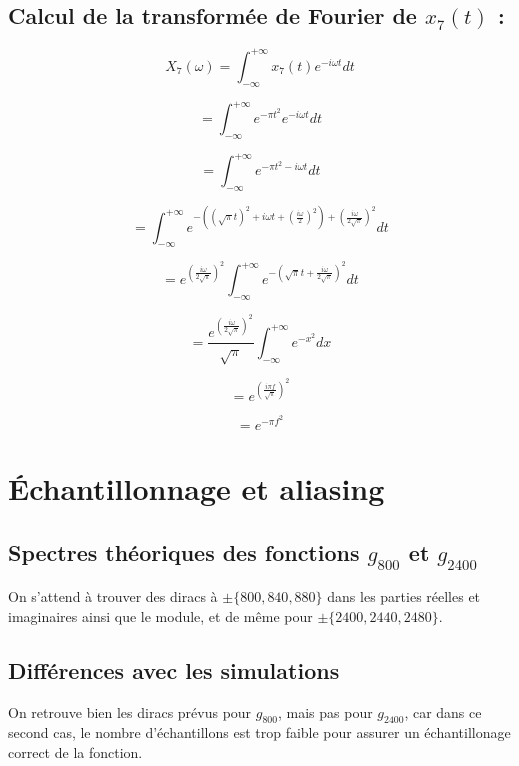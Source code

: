 \documentclass[12pt]{article}
\begin{document}
\subsection{Calcul de la transformée de Fourier de $x_7(t)$ :}
$$X_7(\omega) = \int_{-\infty}^{+\infty} x_7(t) e^{-i\omega t}dt$$

$$= \int_{-\infty}^{+\infty} e^{-\pi t^2} e^{-i\omega t}dt$$

$$= \int_{-\infty}^{+\infty} e^{-\pi t^2 -i\omega t}dt$$

$$= \int_{-\infty}^{+\infty} e^{-((\sqrt{\pi} t)^2 +i\omega t + (\frac{i\omega}{2})^2) + (\frac{i\omega}{2\sqrt{\pi}})^2}dt$$

$$= e^{(\frac{i\omega}{2\sqrt{\pi}})^2} \int_{-\infty}^{+\infty} e^{-(\sqrt{\pi}t + \frac{i\omega}{2\sqrt{\pi}})^2}dt$$

$$= \frac{e^{(\frac{i\omega}{2\sqrt{\pi}})^2}}{\sqrt{\pi}} \int_{-\infty}^{+\infty} e^{-x^2}dx$$

$$= e^{(\frac{i\pi f}{\sqrt{\pi}})^2}$$

$$= e^{-\pi f^2}$$

\section{Échantillonnage et aliasing}
\subsection{Spectres théoriques des fonctions $g_{800}$ et $g_{2400}$}
On s'attend à trouver des diracs à $\pm \{800, 840, 880\}$ dans les parties réelles et imaginaires ainsi que le module, et de même pour $\pm \{2400, 2440, 2480\}$.

\subsection{Différences avec les simulations}
On retrouve bien les diracs prévus pour $g_{800}$, mais pas pour $g_{2400}$, car dans ce second cas, le nombre d'échantillons est trop faible pour assurer un échantillonage correct de la fonction.
\end{document}
